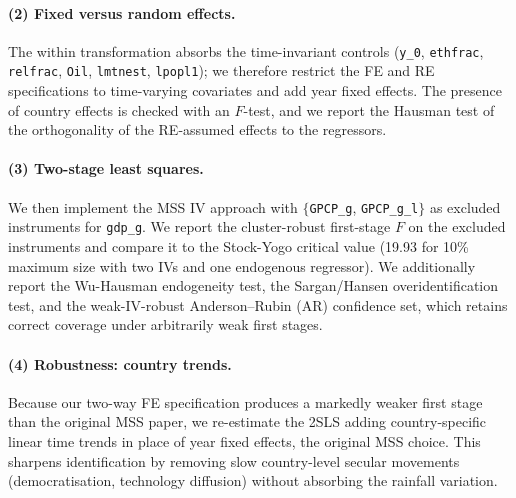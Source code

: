\documentclass[11pt,a4paper]{article}
\begin{document}
\paragraph{(2) Fixed versus random effects.}
The within transformation absorbs the time-invariant controls
(\texttt{y\_0}, \texttt{ethfrac}, \texttt{relfrac}, \texttt{Oil},
\texttt{lmtnest}, \texttt{lpopl1}); we therefore restrict the FE and
RE specifications to time-varying covariates and add year fixed
effects. The presence of country effects is checked with an
$F$-test, and we report the Hausman test of the orthogonality of the
RE-assumed effects to the regressors.

\paragraph{(3) Two-stage least squares.}
We then implement the MSS IV approach with $\{$\texttt{GPCP\_g},
\texttt{GPCP\_g\_l}$\}$ as excluded instruments for \texttt{gdp\_g}.
We report the cluster-robust first-stage $F$ on the excluded
instruments and compare it to the Stock-Yogo critical value (19.93
for 10\% maximum size with two IVs and one endogenous regressor).
We additionally report the Wu-Hausman endogeneity test, the
Sargan/Hansen overidentification test, and the weak-IV-robust
Anderson--Rubin (AR) confidence set, which retains correct coverage
under arbitrarily weak first stages.

\paragraph{(4) Robustness: country trends.}
Because our two-way FE specification produces a markedly weaker first
stage than the original MSS paper, we re-estimate the 2SLS adding
country-specific linear time trends in place of year fixed effects,
the original MSS choice. This sharpens identification by removing
slow country-level secular movements (democratisation, technology
diffusion) without absorbing the rainfall variation.
\end{document}
